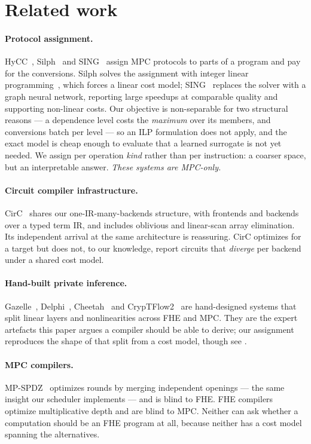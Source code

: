 \documentclass[11pt]{article}
\begin{document}
\section{Related work}\label{sec:related}

\paragraph{Protocol assignment.} HyCC~\cite{HyCC}, Silph~\cite{Silph} and SING~\cite{SING} assign MPC protocols to
parts of a program and pay for the conversions. Silph solves the assignment
with integer linear programming~\cite{Silph}, which forces a linear cost model; SING~\cite{SING}
replaces the solver with a graph neural network, reporting large speedups at
comparable quality and supporting non-linear costs. Our objective is
non-separable for two structural reasons --- a dependence level costs the
\emph{maximum} over its members, and conversions batch per level --- so an ILP
formulation does not apply, and the exact model is cheap enough to evaluate
that a learned surrogate is not yet needed. We assign per operation
\emph{kind} rather than per instruction: a coarser space, but an interpretable
answer. \emph{These systems are MPC-only.}

\paragraph{Circuit compiler infrastructure.} CirC~\cite{CirC} shares our
one-IR-many-backends structure, with frontends and backends over a typed
term IR, and includes oblivious and linear-scan array elimination. Its
independent arrival at the same architecture is reassuring. CirC optimizes for
a target but does not, to our knowledge, report circuits that \emph{diverge}
per backend under a shared cost model.

\paragraph{Hand-built private inference.} Gazelle~\cite{Gazelle},
Delphi~\cite{Delphi}, Cheetah~\cite{Cheetah} and CrypTFlow2~\cite{CrypTFlow2}
are hand-designed systems that split linear layers and
nonlinearities across FHE and MPC. They are the expert artefacts this paper
argues a compiler should be able to derive; our assignment reproduces the
shape of that split from a cost model, though see .

\paragraph{MPC compilers.} MP-SPDZ~\cite{MPSPDZ} optimizes rounds by merging independent
openings --- the same insight our scheduler implements --- and is blind to
FHE. FHE compilers optimize multiplicative depth and are blind to MPC. Neither
can ask whether a computation should be an FHE program at all, because neither
has a cost model spanning the alternatives.
\end{document}
